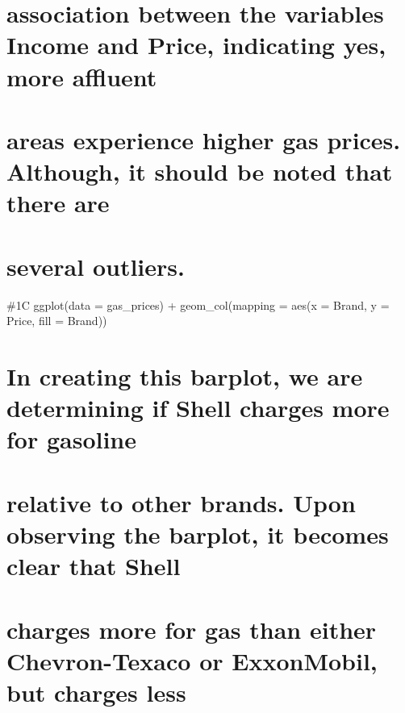 \documentclass[
]{article}
\begin{document}
\hypertarget{association-between-the-variables-income-and-price-indicating-yes-more-affluent}{%
\section{association between the variables Income and Price, indicating
yes, more
affluent}\label{association-between-the-variables-income-and-price-indicating-yes-more-affluent}}

\hypertarget{areas-experience-higher-gas-prices.-although-it-should-be-noted-that-there-are}{%
\section{areas experience higher gas prices. Although, it should be
noted that there
are}\label{areas-experience-higher-gas-prices.-although-it-should-be-noted-that-there-are}}

\hypertarget{several-outliers.}{%
\section{several outliers.}\label{several-outliers.}}

\#1C ggplot(data = gas\_prices) + geom\_col(mapping = aes(x = Brand, y =
Price, fill = Brand))

\hypertarget{in-creating-this-barplot-we-are-determining-if-shell-charges-more-for-gasoline}{%
\section{In creating this barplot, we are determining if Shell charges
more for
gasoline}\label{in-creating-this-barplot-we-are-determining-if-shell-charges-more-for-gasoline}}

\hypertarget{relative-to-other-brands.-upon-observing-the-barplot-it-becomes-clear-that-shell}{%
\section{relative to other brands. Upon observing the barplot, it
becomes clear that
Shell}\label{relative-to-other-brands.-upon-observing-the-barplot-it-becomes-clear-that-shell}}

\hypertarget{charges-more-for-gas-than-either-chevron-texaco-or-exxonmobil-but-charges-less}{%
\section{charges more for gas than either Chevron-Texaco or ExxonMobil,
but charges
less}\label{charges-more-for-gas-than-either-chevron-texaco-or-exxonmobil-but-charges-less}}
\end{document}
